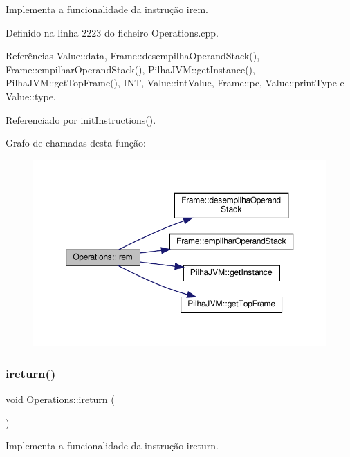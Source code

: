 Implementa a funcionalidade da instrução irem. 



Definido na linha 2223 do ficheiro Operations.\+cpp.



Referências Value\+::data, Frame\+::desempilha\+Operand\+Stack(), Frame\+::empilhar\+Operand\+Stack(), Pilha\+J\+V\+M\+::get\+Instance(), Pilha\+J\+V\+M\+::get\+Top\+Frame(), I\+NT, Value\+::int\+Value, Frame\+::pc, Value\+::print\+Type e Value\+::type.



Referenciado por init\+Instructions().

Grafo de chamadas desta função\+:
\nopagebreak
\begin{figure}[H]
\begin{center}
\leavevmode
\includegraphics[width=350pt]{classOperations_a510bd2d155695861597a4413b44565bc_cgraph}
\end{center}
\end{figure}
\mbox{\label{classOperations_a4be12fb7c8eeee8a2f6489ec27a46dce}} 
\subsubsection{\texorpdfstring{ireturn()}{ireturn()}}
{\footnotesize\ttfamily void Operations\+::ireturn (\begin{DoxyParamCaption}{ }\end{DoxyParamCaption})\hspace{0.3cm}{\ttfamily [private]}}



Implementa a funcionalidade da instrução ireturn. 



